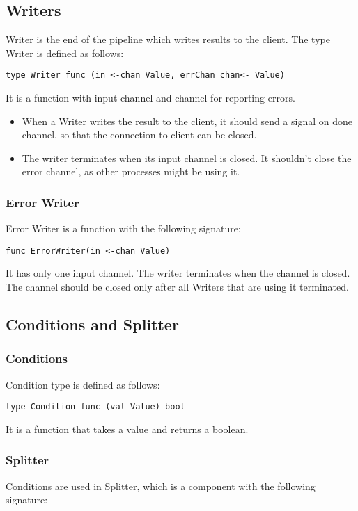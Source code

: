 \documentclass[12pt,a4paper]{article}
\begin{document}
\subsection{Writers}
Writer is the end of the pipeline which writes results to the client.
The type Writer is defined as follows:

\begin{lstlisting}
type Writer func (in <-chan Value, errChan chan<- Value)
\end{lstlisting}

It is a function with input channel and channel for reporting errors.
\begin{itemize}
	\item When a Writer writes the result to the client, it should send a signal
				on done channel, so that the connection to client can be closed.
	\item The writer terminates when its input channel is closed. It shouldn't
			  close the error channel, as other processes might be using it.
\end{itemize}

\subsubsection{Error Writer}
Error Writer is a function with the following signature:

\begin{lstlisting}
func ErrorWriter(in <-chan Value)
\end{lstlisting}
It has only one input channel. The writer terminates when the channel
is closed. The channel should be closed only after all Writers that 
are using it terminated.

\subsection{Conditions and Splitter}
\subsubsection{Conditions}
Condition type is defined as follows:

\begin{lstlisting}
type Condition func (val Value) bool
\end{lstlisting}
It is a function that takes a value and returns a boolean.

\subsubsection{Splitter}
Conditions are used in Splitter, which is a component with the 
following signature:
\end{document}
